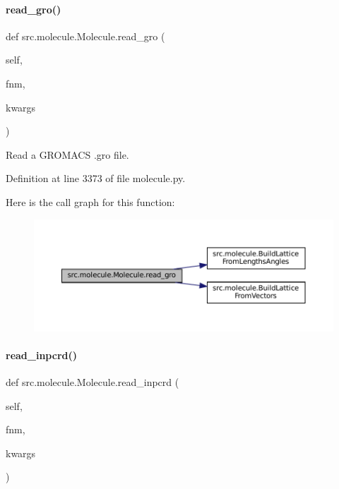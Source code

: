 \paragraph{\texorpdfstring{read\+\_\+gro()}{read\_gro()}}
{\footnotesize\ttfamily def src.\+molecule.\+Molecule.\+read\+\_\+gro (\begin{DoxyParamCaption}\item[{}]{self,  }\item[{}]{fnm,  }\item[{}]{kwargs }\end{DoxyParamCaption})}



Read a G\+R\+O\+M\+A\+CS .gro file. 



Definition at line 3373 of file molecule.\+py.

Here is the call graph for this function\+:
\nopagebreak
\begin{figure}[H]
\begin{center}
\leavevmode
\includegraphics[width=350pt]{classsrc_1_1molecule_1_1Molecule_a4ce0cfbb42e84ec2fe5d8097d0ff5fda_cgraph}
\end{center}
\end{figure}
\mbox{\label{classsrc_1_1molecule_1_1Molecule_a25e54248bd35147e2c2aa210d06a58a5}} 
\paragraph{\texorpdfstring{read\+\_\+inpcrd()}{read\_inpcrd()}}
{\footnotesize\ttfamily def src.\+molecule.\+Molecule.\+read\+\_\+inpcrd (\begin{DoxyParamCaption}\item[{}]{self,  }\item[{}]{fnm,  }\item[{}]{kwargs }\end{DoxyParamCaption})}



